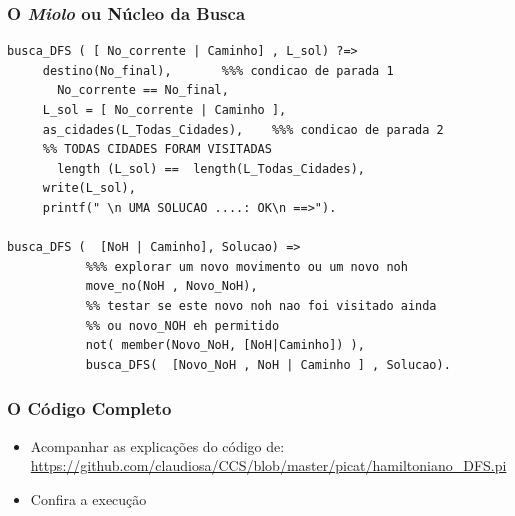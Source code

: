 \begin{frame}[fragile]
 \frametitle{O \textit{Miolo} ou Núcleo  da Busca}

\begin{footnotesize}
\begin{verbatim}
busca_DFS ( [ No_corrente | Caminho] , L_sol) ?=>
     destino(No_final),       %%% condicao de parada 1
	   No_corrente == No_final,
     L_sol = [ No_corrente | Caminho ],
     as_cidades(L_Todas_Cidades),    %%% condicao de parada 2
     %% TODAS CIDADES FORAM VISITADAS
	   length (L_sol) ==  length(L_Todas_Cidades),
     write(L_sol),
     printf(" \n UMA SOLUCAO ....: OK\n ==>"). 

busca_DFS (  [NoH | Caminho], Solucao) =>
           %%% explorar um novo movimento ou um novo noh
           move_no(NoH , Novo_NoH), 
           %% testar se este novo noh nao foi visitado ainda
           %% ou novo_NOH eh permitido
           not( member(Novo_NoH, [NoH|Caminho]) ),
           busca_DFS(  [Novo_NoH , NoH | Caminho ] , Solucao).
\end{verbatim}
\end{footnotesize}

\end{frame}


\begin{frame}[fragile]
 \frametitle{O Código Completo}

\begin{itemize}
  \item Acompanhar as explicações do código de:\\
\url{https://github.com/claudiosa/CCS/blob/master/picat/hamiltoniano_DFS.pi}

  \item Confira a execuç\~ao
\end{itemize}
\end{frame}



